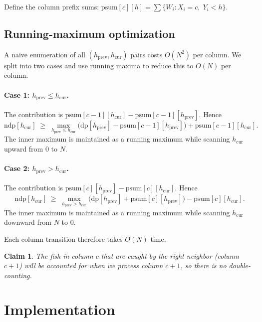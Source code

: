 \documentclass[11pt,a4paper]{article}
\newtheorem{claim}[theorem]{Claim}
\begin{document}
Define the column prefix sums:
$\mathrm{psum}[c][h] = \sum\{W_i : X_i = c,\; Y_i < h\}$.

\subsection{Running-maximum optimization}

A naive enumeration of all $(h_{\mathrm{prev}}, h_{\mathrm{cur}})$ pairs costs
$O(N^2)$ per column.  We split into two cases and use running maxima
to reduce this to $O(N)$ per column.

\paragraph{Case 1: $h_{\mathrm{prev}} \le h_{\mathrm{cur}}$.}
The contribution is $\mathrm{psum}[c{-}1][h_{\mathrm{cur}}] - \mathrm{psum}[c{-}1][h_{\mathrm{prev}}]$.
Hence
\[
  \mathrm{ndp}[h_{\mathrm{cur}}]
  \;\ge\;
  \max_{h_{\mathrm{prev}} \le h_{\mathrm{cur}}}
  \bigl(\mathrm{dp}[h_{\mathrm{prev}}] - \mathrm{psum}[c{-}1][h_{\mathrm{prev}}]\bigr)
  + \mathrm{psum}[c{-}1][h_{\mathrm{cur}}].
\]
The inner maximum is maintained as a running maximum while scanning
$h_{\mathrm{cur}}$ upward from 0 to $N$.

\paragraph{Case 2: $h_{\mathrm{prev}} > h_{\mathrm{cur}}$.}
The contribution is $\mathrm{psum}[c][h_{\mathrm{prev}}] - \mathrm{psum}[c][h_{\mathrm{cur}}]$.
Hence
\[
  \mathrm{ndp}[h_{\mathrm{cur}}]
  \;\ge\;
  \max_{h_{\mathrm{prev}} > h_{\mathrm{cur}}}
  \bigl(\mathrm{dp}[h_{\mathrm{prev}}] + \mathrm{psum}[c][h_{\mathrm{prev}}]\bigr)
  - \mathrm{psum}[c][h_{\mathrm{cur}}].
\]
The inner maximum is maintained as a running maximum while scanning
$h_{\mathrm{cur}}$ downward from $N$ to 0.

Each column transition therefore takes $O(N)$ time.

\begin{claim}
The fish in column $c$ that are caught by the right neighbor (column $c{+}1$)
will be accounted for when we process column $c{+}1$, so there is no
double-counting.
\end{claim}

\section{Implementation}
\end{document}
